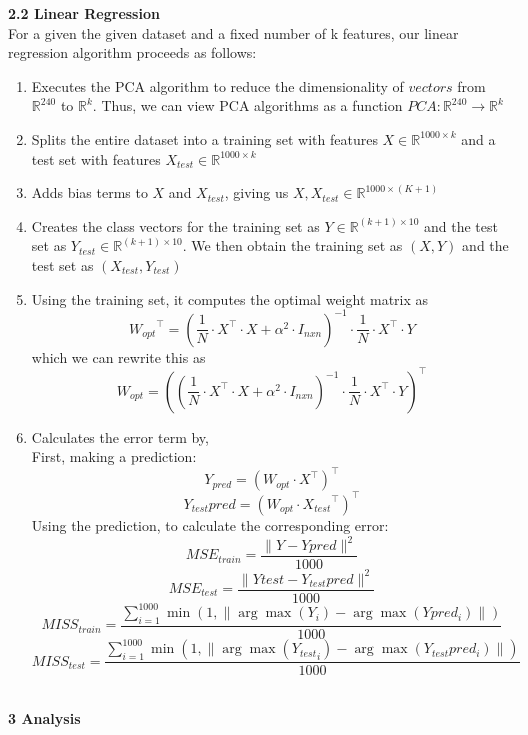 \documentclass[a4paper]{article}
\begin{document}
\textbf{{\large 2.2 Linear Regression}} \\

For a given the given dataset and a fixed number of k features, our linear regression algorithm proceeds as follows: 
\begin{enumerate}
\item  Executes the PCA algorithm to reduce the dimensionality of $vectors$ from $\mathbb{R}^{240}$ to $\mathbb{R}^{k}$. Thus, we can view PCA algorithms as a function $PCA: \mathbb{R}^{240} \to \mathbb{R}^{k}$
\item Splits the entire dataset into a training set with features $X \in \mathbb{R}^{1000 \times k}$ and a test set with features $X_{test} \in \mathbb{R}^{1000 \times k}$
\item  Adds bias terms to $X$ and $X_{test}$, giving us $X, X_{test} \in \mathbb{R}^{1000 \times (K + 1)}$ 
\item Creates the class vectors for the training set as $Y \in \mathbb{R}^{(k + 1) \times 10}$ and the test set as $Y_{test} \in \mathbb{R}^{(k + 1) \times 10}$. We then obtain the training set as $(X, Y)$ and the test set as $(X_{test}, Y_{test})$
\item Using the training set, it computes the optimal weight matrix as 
$$ {W_{opt}}^\top = (\frac{1}{N} \cdot X^\top \cdot X + \alpha^2 \cdot I_{nxn})^{-1} \cdot \frac{1}{N} \cdot X^\top \cdot Y $$
which we can rewrite this as 
$$ W_{opt} = ((\frac{1}{N} \cdot X^\top \cdot X + \alpha^2 \cdot I_{nxn})^{-1} \cdot \frac{1}{N} \cdot X^\top \cdot Y)^\top $$
\item Calculates the error term by,  \\
First, making a prediction: 
$$ Y_{pred} = (W_{opt} \cdot X^\top)^\top $$
$$ Y_{test}pred = (W_{opt} \cdot {X_{test}}^\top)^\top $$
Using the prediction, to calculate the corresponding error:
$$ MSE_{train} = \frac{\|Y - Ypred\|^2}{1000} $$
$$ MSE_{test} = \frac{\|Ytest - Y_{test}pred\|^2}{1000} $$
$$ MISS_{train} = \frac{\sum_{i = 1}^{1000} \min(1, \|\arg\max(Y_i) - \arg\max(Ypred_i)\|)}{1000} $$
$$ MISS_{test} = \frac{\sum_{i = 1}^{1000} \min(1, \|\arg\max({Y_{test}}_i) - \arg\max(Y_{test}pred_i)\|)}{1000} $$ \\ 
\end{enumerate}
\newpage
\textbf{{\Large 3 Analysis}} \\ 
\end{document}
